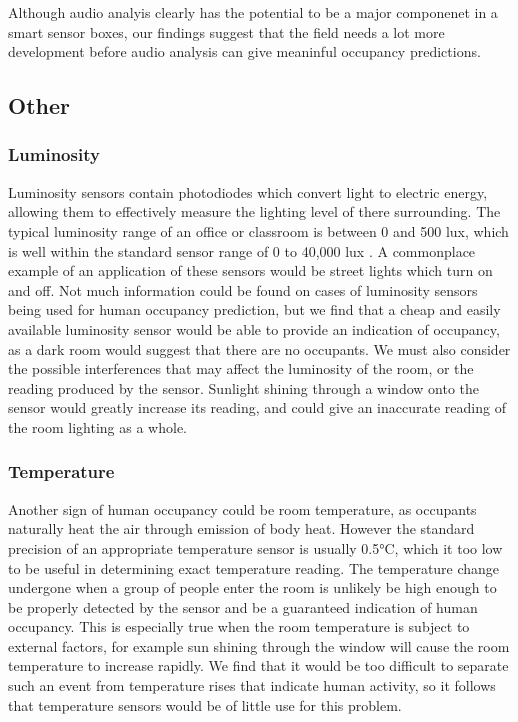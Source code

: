 \documentclass{l4proj}
\begin{document}
Although audio analyis clearly has the potential to be a major componenet in a smart sensor boxes, our findings suggest that the field needs a lot more development before audio analysis can give meaninful occupancy predictions.

\subsection{Other}
\subsubsection{Luminosity}
Luminosity sensors contain photodiodes which convert light to electric energy, allowing them to effectively measure the lighting level of there surrounding. The typical luminosity range of an office or classroom is between 0 and 500 lux, which is well within the standard sensor range of 0 to 40,000 lux . A commonplace example of an application of these sensors would be street lights which turn on and off. Not much information could be found on cases of luminosity sensors being used for human occupancy prediction, but we find that a cheap and easily available luminosity sensor would be able to provide an indication of occupancy, as a dark room would suggest that there are no occupants. We must also consider the possible interferences that may affect the luminosity of the room, or the reading produced by the sensor. Sunlight shining through a window onto the sensor would greatly increase its reading, and could give an inaccurate reading of the room lighting as a whole.
\subsubsection{Temperature}
Another sign of human occupancy could be room temperature, as occupants naturally heat the air through emission of body heat. However the standard precision of an appropriate temperature sensor is usually 0.5°C, which it too low to be useful in determining exact temperature reading. The temperature change undergone when a group of people enter the room is unlikely be high enough to be properly detected by the sensor and be a guaranteed indication of human occupancy. This is especially true when the room temperature is subject to external factors, for example sun shining through the window will cause the room temperature to increase rapidly. We find that it would be too difficult to separate such an event from temperature rises that indicate human activity, so it follows that temperature sensors would be of little use for this problem.
\end{document}

